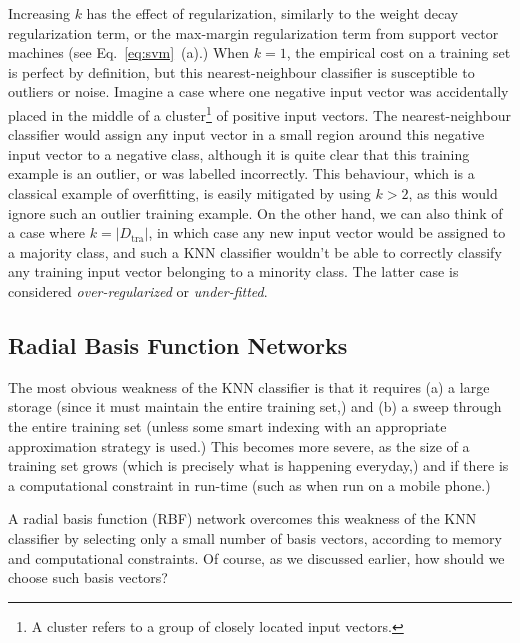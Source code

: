 \documentclass{report}
\newcommand{\tra}{\text{tra}}
\begin{document}
Increasing $k$ has the effect of regularization, similarly to the weight decay
regularization term, or the max-margin regularization term from support vector
machines (see Eq.~\eqref{eq:svm}~(a).) When $k=1$, the empirical cost on a
training set is perfect by definition, but this nearest-neighbour classifier is
susceptible to outliers or noise. Imagine a case where one negative input vector
was accidentally placed in the middle of a cluster\footnote{
    A cluster refers to a group of closely located input vectors. 
}
of positive input vectors. The nearest-neighbour classifier would assign any
input vector in a small region around this negative input vector to a negative
class, although it is quite clear that this training example is an outlier, or
was labelled incorrectly. This behaviour, which is a classical example of
overfitting, is easily mitigated by using $k > 2$, as this would ignore such an
outlier training example. On the other hand, we can also think of a case where
$k = |D_{\tra}|$, in which case any new input vector would be assigned to a
majority class, and such a KNN classifier wouldn't be able to correctly classify
any training input vector belonging to a minority class. The latter case is
considered {\it over-regularized} or {\it under-fitted}. 


\subsection{Radial Basis Function Networks}

The most obvious weakness of the KNN classifier is that it requires (a) a large
storage (since it must maintain the entire training set,) and (b) a sweep
through the entire training set (unless some smart indexing with an appropriate
approximation strategy is used.) This becomes more severe, as the size of a
training set grows (which is precisely what is happening everyday,) and if there
is a computational constraint in run-time (such as when run on a mobile phone.) 

A radial basis function (RBF) network overcomes this weakness of the KNN
classifier by selecting only a small number of basis vectors, according to
memory and computational constraints. Of course, as we discussed earlier, how
should we choose such basis vectors?
\end{document}

